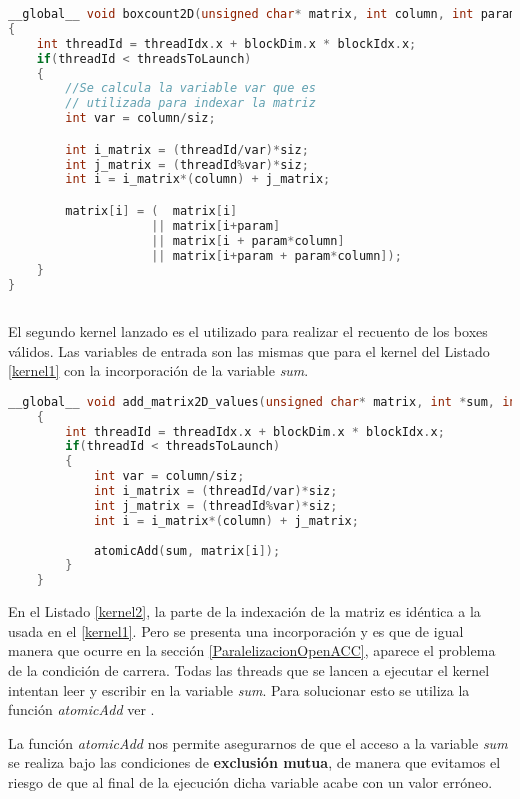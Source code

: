 \newpage
\begin{lstlisting}[language=C++,caption={Kernel boxcount2D},label=kernel1]
__global__ void boxcount2D(unsigned char* matrix, int column, int param, int siz, int threadsToLaunch)
{
    int threadId = threadIdx.x + blockDim.x * blockIdx.x;
    if(threadId < threadsToLaunch)
    {
        //Se calcula la variable var que es 
        // utilizada para indexar la matriz
        int var = column/siz;

        int i_matrix = (threadId/var)*siz;
        int j_matrix = (threadId%var)*siz;
        int i = i_matrix*(column) + j_matrix;

        matrix[i] = (  matrix[i] 
                    || matrix[i+param] 
                    || matrix[i + param*column] 
                    || matrix[i+param + param*column]);        
    }
}
    
\end{lstlisting}

El segundo kernel lanzado es el utilizado para realizar el recuento de los boxes válidos. Las variables de entrada son las mismas que para el kernel del Listado \ref{kernel1} con la incorporación de la variable \textit{sum}.
\newpage
\begin{lstlisting}[language=C++,caption={Kernel para la acumulación de boxes válidos},label=kernel2]
    __global__ void add_matrix2D_values(unsigned char* matrix, int *sum, int column, int siz, int threadsToLaunch)
    {    
        int threadId = threadIdx.x + blockDim.x * blockIdx.x;
        if(threadId < threadsToLaunch)
        {
            int var = column/siz;
            int i_matrix = (threadId/var)*siz;
            int j_matrix = (threadId%var)*siz;
            int i = i_matrix*(column) + j_matrix;
        
            atomicAdd(sum, matrix[i]);
        } 
    }
\end{lstlisting}

En el Listado \ref{kernel2}, la parte de la indexación de la matriz es idéntica a la usada en el \ref{kernel1}. Pero se presenta una incorporación y es que de igual manera que ocurre en la sección \ref{ParalelizacionOpenACC}, aparece el problema de la condición de carrera. Todas las threads que se lancen a ejecutar el kernel intentan leer y escribir en la variable \textit{sum}. Para solucionar esto se utiliza la función \textit{atomicAdd} ver \cite{unknown-author-2021H}.

La función \textit{atomicAdd} nos permite asegurarnos de que el acceso a la variable \textit{sum} se realiza bajo las condiciones de \textbf{exclusión mutua}, de manera que evitamos el riesgo de que al final de la ejecución dicha variable acabe con un valor erróneo.